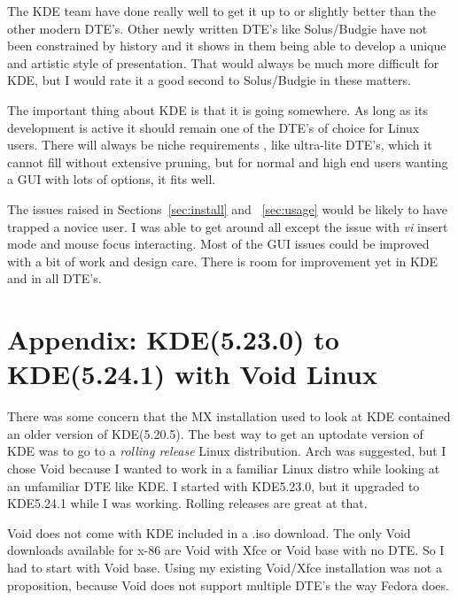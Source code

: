 \documentclass{article}  %
\begin{document}
The KDE team have done really well to get it up to or slightly better than the other modern DTE's. Other newly written DTE's like Solus/Budgie have not been constrained by history and it shows in them being able to develop a unique and artistic style of presentation. That would always be much more difficult for KDE, but I would rate it a good second to Solus/Budgie in these matters.

The important thing about KDE is that it is going somewhere. As long as its development is active it should remain one of the DTE's of choice for Linux users.  There will always be niche requirements , like ultra-lite DTE's, which it cannot fill without extensive pruning, but for normal and high end users wanting a GUI with lots of options, it fits well. 

The issues raised in Sections~\ref{sec:install} and ~\ref{sec:usage} would be likely to have trapped a novice user.  I was able to get around all except the issue with {\em vi} insert mode and mouse focus interacting. Most of the GUI issues could be improved with a bit of work and design care. There is room for improvement yet in KDE and in all DTE's.
 
\appendix
\section{Appendix: KDE(5.23.0) to KDE(5.24.1) with Void Linux}
There was some concern that the MX installation used to look at KDE contained an older version of KDE(5.20.5).  The best way to get an uptodate version of KDE was to go to a {\em rolling release} Linux distribution. Arch was suggested, but I chose Void because I wanted to work in a familiar Linux distro while looking at an unfamiliar DTE like KDE.  I started with KDE5.23.0, but it upgraded to KDE5.24.1 while I was working. Rolling releases are great at that.

Void does not come with KDE included in a .iso download. The only Void downloads available for x-86 are Void with Xfce or Void base with no DTE. So I had to start with Void base. Using my existing Void/Xfce installation was not a proposition, because Void does not support  multiple DTE's the way Fedora does.
\end{document}
